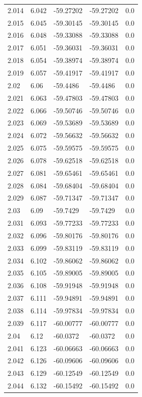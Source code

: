 \begin{tabular}{lllll}
2.014 & 6.042 & -59.27202 & -59.27202 & 0.0 \\
2.015 & 6.045 & -59.30145 & -59.30145 & 0.0 \\
2.016 & 6.048 & -59.33088 & -59.33088 & 0.0 \\
2.017 & 6.051 & -59.36031 & -59.36031 & 0.0 \\
2.018 & 6.054 & -59.38974 & -59.38974 & 0.0 \\
2.019 & 6.057 & -59.41917 & -59.41917 & 0.0 \\
2.02 & 6.06 & -59.4486 & -59.4486 & 0.0 \\
2.021 & 6.063 & -59.47803 & -59.47803 & 0.0 \\
2.022 & 6.066 & -59.50746 & -59.50746 & 0.0 \\
2.023 & 6.069 & -59.53689 & -59.53689 & 0.0 \\
2.024 & 6.072 & -59.56632 & -59.56632 & 0.0 \\
2.025 & 6.075 & -59.59575 & -59.59575 & 0.0 \\
2.026 & 6.078 & -59.62518 & -59.62518 & 0.0 \\
2.027 & 6.081 & -59.65461 & -59.65461 & 0.0 \\
2.028 & 6.084 & -59.68404 & -59.68404 & 0.0 \\
2.029 & 6.087 & -59.71347 & -59.71347 & 0.0 \\
2.03 & 6.09 & -59.7429 & -59.7429 & 0.0 \\
2.031 & 6.093 & -59.77233 & -59.77233 & 0.0 \\
2.032 & 6.096 & -59.80176 & -59.80176 & 0.0 \\
2.033 & 6.099 & -59.83119 & -59.83119 & 0.0 \\
2.034 & 6.102 & -59.86062 & -59.86062 & 0.0 \\
2.035 & 6.105 & -59.89005 & -59.89005 & 0.0 \\
2.036 & 6.108 & -59.91948 & -59.91948 & 0.0 \\
2.037 & 6.111 & -59.94891 & -59.94891 & 0.0 \\
2.038 & 6.114 & -59.97834 & -59.97834 & 0.0 \\
2.039 & 6.117 & -60.00777 & -60.00777 & 0.0 \\
2.04 & 6.12 & -60.0372 & -60.0372 & 0.0 \\
2.041 & 6.123 & -60.06663 & -60.06663 & 0.0 \\
2.042 & 6.126 & -60.09606 & -60.09606 & 0.0 \\
2.043 & 6.129 & -60.12549 & -60.12549 & 0.0 \\
2.044 & 6.132 & -60.15492 & -60.15492 & 0.0 \\

\end{tabular}
